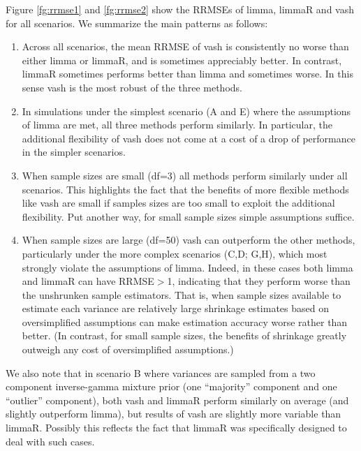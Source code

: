 \documentclass{bioinfo}
\begin{document}
Figure \ref{fg:rrmse1} and \ref{fg:rrmse2} show the RRMSEs of limma, limmaR and vash for all scenarios.
We summarize the main patterns as follows:
\begin{enumerate}
\item Across all scenarios, the mean RRMSE of vash is consistently no worse than either limma or limmaR, and is sometimes appreciably better.
In contrast, limmaR sometimes performs better than limma and sometimes worse. In this sense vash is the most robust of the three methods.

\item In simulations under the simplest scenario (A and E) where the assumptions of limma are met, all three methods perform similarly. In particular,
the additional flexibility of vash does not come at a cost of a drop of performance in the simpler scenarios. 

\item When sample sizes are small (df=3) all methods perform similarly under all scenarios. This highlights the fact that the benefits of more flexible methods
like vash are small if samples sizes are too small to exploit the additional flexibility. Put another way, for small sample sizes simple assumptions suffice.

\item When sample sizes are large (df=50) vash can outperform the other methods, particularly under the more complex scenarios (C,D; G,H), which most strongly violate the assumptions of limma. Indeed, in these cases both limma and limmaR can have RRMSE$>$1, indicating that they perform worse than the unshrunken sample estimators. 
That is, when sample sizes available to estimate each variance are relatively large shrinkage estimates based on oversimplified assumptions
can make estimation accuracy worse rather than better. (In contrast, for small sample sizes, the benefits of shrinkage greatly outweigh any cost of oversimplified assumptions.)
\end{enumerate}
 We also note that in scenario B where variances are sampled from a two component inverse-gamma mixture prior (one ``majority'' component and one ``outlier'' component), both vash and limmaR perform similarly on average (and slightly outperform limma), but results of vash are slightly more variable than limmaR. Possibly this reflects the fact that limmaR was specifically designed to deal with such cases.

\end{document}
